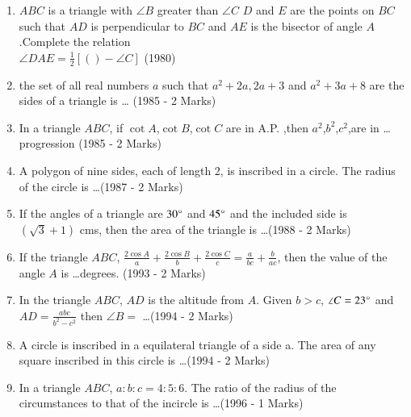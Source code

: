 \documentclass[journal,12pt,onecolumn]{IEEEtran}
\theoremstyle{remark}
\begin{document}
\begin{enumerate}
    \item $ABC$ is a triangle with $\angle B $ greater than $\angle C$ 
    $D$ and $E$ are the points on $BC$ such that $AD$ is perpendicular to $BC$ and $AE$ is the bisector of angle $A$ .Complete the relation\\
    $\angle DAE = \frac{1}{2} [( ) - \angle C]$
    \hfill (1980)
    \item the set of all real numbers $a$ such that $a^2 + 2a, 2a + 3$ and $a^2 + 3a + 8$ are the sides of a triangle is \dots
    \hfill (1985 - 2 Marks)
    \item In a triangle $ABC$, if $\cot A$,$\cot B$,$\cot C$ are in A.P. ,then $a^2$,$b^2$,$c^2$,are in \dots progression \hfill (1985 - 2 Marks)
    \item A polygon of nine sides, each of length 2, is inscribed in a circle. The radius of the circle is \dots \hfill (1987 - 2 Marks) 
    \item If the angles of a triangle are $30\degree$ and $45\degree$ and the included side is $(\sqrt{3} + 1)$ cms, then the area of the triangle is \dots \hfill (1988 - 2 Marks)
    \item If the triangle $ABC$, $\frac{2\cos A}{a} + \frac{2\cos B}{b} + \frac{2\cos C}{c} = \frac{a}{bc} +  \frac{b}{ac}$, then the value of the angle $A$ is \dots degrees. \hfil (1993 - 2 Marks)
    \item In the triangle $ABC$, $AD$ is the altitude from $A$. Given $b>c$, $\angle C=23 \degree$ and $AD = \frac{abc}{b^2 - c^2}$ then $\angle B = $ \dots \hfill (1994 - 2 Marks)
    \item A circle is inscribed in a equilateral triangle of a side a. The area of any square inscribed in this circle is \dots \hfill (1994 - 2 Marks)  
    \item In a triangle $ABC$, $a:b:c = 4:5:6$. The ratio of the radius of the circumstances to that of the incircle is \dots \hfill (1996 - 1 Marks) 
\end{enumerate}
\end{document}

